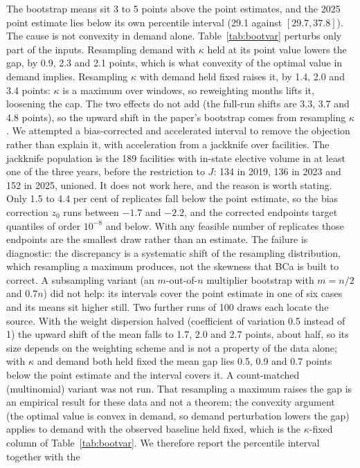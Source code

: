 The bootstrap means sit 3 to 5 points above the point estimates, and the 2025 point estimate lies below
its own percentile interval (29.1 against $[29.7, 37.8]$). The cause is not convexity in demand alone.
Table~\ref{tab:bootvar} perturbs only part of the inputs. Resampling demand with $\kappa$ held at its point
value lowers the gap, by 0.9, 2.3 and 2.1 points, which is what convexity of the optimal value in demand
implies. Resampling $\kappa$ with demand held fixed raises it, by 1.4, 2.0 and 3.4 points: $\kappa$ is a
maximum over windows, so reweighting months lifts it, loosening the cap. The two effects do not add (the
full-run shifts are 3.3, 3.7 and 4.8 points), so the upward shift in the paper's bootstrap comes from resampling
$\kappa$. We attempted a
bias-corrected and accelerated interval to remove the objection rather than
explain it, with acceleration from a jackknife over facilities. The jackknife
population is the 189 facilities with in-state elective volume in at least one of
the three years, before the restriction to $J$: 134 in 2019, 136 in 2023 and 152
in 2025, unioned. It does
not work here, and the reason is worth stating. Only 1.5 to 4.4 per cent of
replicates fall below the point estimate, so the bias correction $z_0$ runs
between $-1.7$ and $-2.2$, and the corrected endpoints target quantiles of order
$10^{-8}$ and below. With any feasible number of replicates those endpoints are
the smallest draw rather than an estimate. The failure is diagnostic: the
discrepancy is a systematic shift of the resampling distribution, which resampling a maximum
produces, not the skewness that BCa is built to correct. A subsampling variant (an $m$-out-of-$n$
multiplier bootstrap with $m = n/2$ and $0.7n$) did not help: its intervals cover the point estimate in one
of six cases and its means sit higher still. Two further runs of 100 draws each locate the source. With the weight dispersion halved (coefficient of variation 0.5 instead of 1) the upward shift of
the mean falls to 1.7, 2.0 and 2.7 points, about half, so its size depends on the weighting scheme and is not a property of the data alone; with $\kappa$ and demand both held fixed the mean gap lies 0.5, 0.9 and
0.7 points below the point estimate and the interval covers it. A count-matched (multinomial) variant was not run. That resampling a maximum raises the gap is an empirical result for these data and not a theorem; the convexity argument (the optimal value is convex in demand, so demand perturbation lowers the gap) applies to demand with the observed baseline held fixed, which is the $\kappa$-fixed column of Table~\ref{tab:bootvar}. We therefore report the percentile interval together with the
